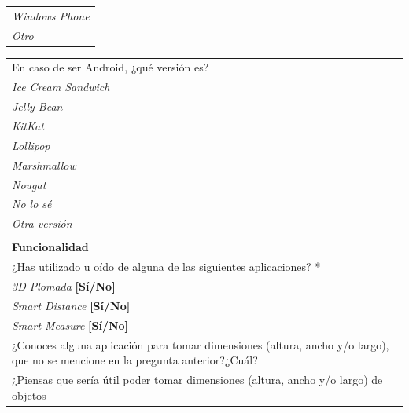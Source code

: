 \begin{center}
\begin{tabular}{|p{16cm}|}
        	 \hspace{1cm}\textit{Windows Phone}\\
        	 \hspace{1cm}\textit{Otro}\\
        	 \hline
    \end{tabular}
    \newpage
    \begin{tabular}{|p{16cm}|}
        	 \hline
        	 En caso de ser Android, ¿qué versión es?\\
        	 \hspace{1cm}\textit{Ice Cream Sandwich}\\
            \hspace{1cm}\textit{Jelly Bean}\\
        	 \hspace{1cm}\textit{KitKat}\\
        	 \hspace{1cm}\textit{Lollipop}\\
        	 \hspace{1cm}\textit{Marshmallow}\\
        	 \hspace{1cm}\textit{Nougat}\\
        	 \hspace{1cm}\textit{No lo sé}\\
        	 \hspace{1cm}\textit{Otra versión}\\
        	 \hline
            \rowcolor[rgb]{0.8,0.8,0.8}\\
            \rowcolor[rgb]{0.8,0.8,0.8}
            \textbf{\color{darkgray}Funcionalidad} \\ [0.3cm]
            ¿Has utilizado u oído de alguna de las siguientes aplicaciones? \textcolor{rojo}{*}\\
            \hspace{1cm}\textit{3D Plomada} \textbf{[Sí/No]}\\
            \hspace{1cm}\textit{Smart Distance} \textbf{[Sí/No]}\\
        	 \hspace{1cm}\textit{Smart Measure} \textbf{[Sí/No]}\\
	 \hline
	 ¿Conoces alguna aplicación para tomar dimensiones (altura, ancho y/o largo), que no se mencione
	  en la pregunta anterior?¿Cuál?\\
	  \hline
	  ¿Piensas que sería útil poder tomar dimensiones (altura, ancho y/o largo) de objetos

\end{tabular}
\end{center}
